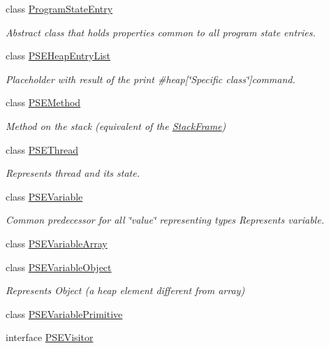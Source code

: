 \begin{DoxyCompactItemize}
\item 
class \hyperlink{classgov_1_1nasa_1_1jpf_1_1inspector_1_1common_1_1pse_1_1_program_state_entry}{Program\+State\+Entry}
\begin{DoxyCompactList}\small\item\em Abstract class that holds properties common to all program state entries. \end{DoxyCompactList}\item 
class \hyperlink{classgov_1_1nasa_1_1jpf_1_1inspector_1_1common_1_1pse_1_1_p_s_e_heap_entry_list}{P\+S\+E\+Heap\+Entry\+List}
\begin{DoxyCompactList}\small\item\em Placeholder with result of the {\ttfamily print \#heap\mbox{[}\char`\"{}\+Specific class\char`\"{}\mbox{]}{\ttfamily  command. }}\end{DoxyCompactList}\item 
class \hyperlink{classgov_1_1nasa_1_1jpf_1_1inspector_1_1common_1_1pse_1_1_p_s_e_method}{P\+S\+E\+Method}
\begin{DoxyCompactList}\small\item\em Method on the stack (equivalent of the \hyperlink{}{Stack\+Frame}) \end{DoxyCompactList}\item 
class \hyperlink{classgov_1_1nasa_1_1jpf_1_1inspector_1_1common_1_1pse_1_1_p_s_e_thread}{P\+S\+E\+Thread}
\begin{DoxyCompactList}\small\item\em Represents thread and its state. \end{DoxyCompactList}\item 
class \hyperlink{classgov_1_1nasa_1_1jpf_1_1inspector_1_1common_1_1pse_1_1_p_s_e_variable}{P\+S\+E\+Variable}
\begin{DoxyCompactList}\small\item\em Common predecessor for all \char`\"{}value\char`\"{} representing types Represents variable. \end{DoxyCompactList}\item 
class \hyperlink{classgov_1_1nasa_1_1jpf_1_1inspector_1_1common_1_1pse_1_1_p_s_e_variable_array}{P\+S\+E\+Variable\+Array}
\item 
class \hyperlink{classgov_1_1nasa_1_1jpf_1_1inspector_1_1common_1_1pse_1_1_p_s_e_variable_object}{P\+S\+E\+Variable\+Object}
\begin{DoxyCompactList}\small\item\em Represents Object (a heap element different from array) \end{DoxyCompactList}\item 
class \hyperlink{classgov_1_1nasa_1_1jpf_1_1inspector_1_1common_1_1pse_1_1_p_s_e_variable_primitive}{P\+S\+E\+Variable\+Primitive}
\item 
interface \hyperlink{interfacegov_1_1nasa_1_1jpf_1_1inspector_1_1common_1_1pse_1_1_p_s_e_visitor}{P\+S\+E\+Visitor}
\end{DoxyCompactItemize}


